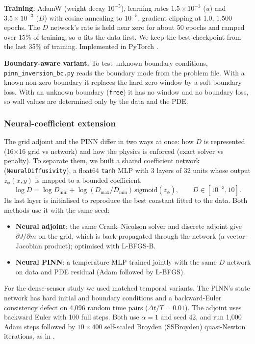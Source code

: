 \documentclass[twoside,english]{article}
\begin{document}
\textbf{Training.} AdamW \citep{kingma2015,loshchilov2019} (weight decay $10^{-5}$), learning rates $1.5\times10^{-3}$ ($u$) and $3.5\times10^{-3}$ ($D$) with cosine annealing to $10^{-5}$, gradient clipping at 1.0, 1{,}500 epochs. The $D$ network's rate is held near zero for about 50 epochs and ramped over 15\% of training, so $u$ fits the data first. We keep the best checkpoint from the last 35\% of training. Implemented in PyTorch \citep{paszke2019}.

\textbf{Boundary-aware variant.} To test unknown boundary conditions, \texttt{pinn\_inversion\_bc.py} reads the boundary mode from the problem file. With a known non-zero boundary it replaces the hard zero window by a soft boundary loss. With an unknown boundary (\texttt{free}) it has no window and no boundary loss, so wall values are determined only by the data and the PDE.

\subsubsection{Neural-coefficient extension}
The grid adjoint and the PINN differ in two ways at once: how $D$ is represented (16$\times$16 grid vs network) and how the physics is enforced (exact solver vs penalty). To separate them, we built a shared coefficient network (\texttt{NeuralDiffusivity}), a float64 \texttt{tanh} MLP with 3 layers of 32 units whose output $z_\phi(x,y)$ is mapped to a bounded coefficient,
\begin{equation}
\log D=\log D_{\min}+\log(D_{\max}/D_{\min})\,\mathrm{sigmoid}(z_\phi),\qquad D\in[10^{-3},10].
\end{equation} Its last layer is initialised to reproduce the best constant fitted to the data. Both methods use it with the same seed:
\begin{itemize}
\item \textbf{Neural adjoint}: the same Crank--Nicolson solver and discrete adjoint give $\partial J/\partial m$ on the grid, which is back-propagated through the network (a vector--Jacobian product); optimised with L-BFGS-B.
\item \textbf{Neural PINN}: a temperature MLP trained jointly with the same $D$ network on data and PDE residual (Adam followed by L-BFGS).
\end{itemize}
For the dense-sensor study we used matched temporal variants. The PINN's state network has hard initial and boundary conditions and a backward-Euler consistency defect on 4{,}096 random time pairs ($\Delta t/T=0.01$). The adjoint uses backward Euler with 100 full steps. Both use $\alpha=1$ and seed 42, and run 1{,}000 Adam steps followed by $10\times400$ self-scaled Broyden (SSBroyden) quasi-Newton iterations, as in \citep{zhang2026}.
\end{document}
